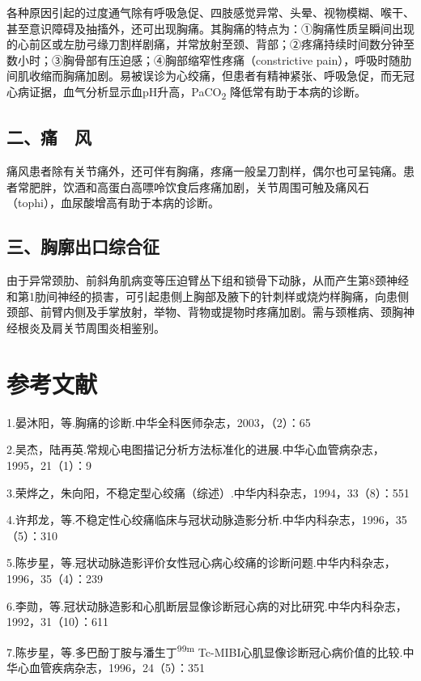 各种原因引起的过度通气除有呼吸急促、四肢感觉异常、头晕、视物模糊、喉干、甚至意识障碍及抽搐外，还可出现胸痛。其胸痛的特点为：①胸痛性质呈瞬间出现的心前区或左肋弓缘刀割样剧痛，并常放射至颈、背部；②疼痛持续时间数分钟至数小时；③胸骨部有压迫感；④胸部缩窄性疼痛（constrictive
pain），呼吸时随肋间肌收缩而胸痛加剧。易被误诊为心绞痛，但患者有精神紧张、呼吸急促，而无冠心病证据，血气分析显示血pH升高，PaCO\textsubscript{2}
降低常有助于本病的诊断。

\subsection{二、痛　风}

痛风患者除有关节痛外，还可伴有胸痛，疼痛一般呈刀割样，偶尔也可呈钝痛。患者常肥胖，饮酒和高蛋白高嘌呤饮食后疼痛加剧，关节周围可触及痛风石（tophi），血尿酸增高有助于本病的诊断。

\subsection{三、胸廓出口综合征}

由于异常颈肋、前斜角肌病变等压迫臂丛下组和锁骨下动脉，从而产生第8颈神经和第1肋间神经的损害，可引起患侧上胸部及腋下的针刺样或烧灼样胸痛，向患侧颈部、前臂内侧及手掌放射，举物、背物或提物时疼痛加剧。需与颈椎病、颈胸神经根炎及肩关节周围炎相鉴别。

\protect\hypertarget{text00102.html}{}{}

\section{参考文献}

1.晏沐阳，等.胸痛的诊断.中华全科医师杂志，2003，（2）：65

2.吴杰，陆再英.常规心电图描记分析方法标准化的进展.中华心血管病杂志，1995，21（1）：9

3.荣烨之，朱向阳，不稳定型心绞痛（综述）.中华内科杂志，1994，33（8）：551

4.许邦龙，等.不稳定性心绞痛临床与冠状动脉造影分析.中华内科杂志，1996，35（5）：310

5.陈步星，等.冠状动脉造影评价女性冠心病心绞痛的诊断问题.中华内科杂志，1996，35（4）：239

6.李勋，等.冠状动脉造影和心肌断层显像诊断冠心病的对比研究.中华内科杂志，1992，31（10）：611

7.陈步星，等.多巴酚丁胺与潘生丁\textsuperscript{99m}
Tc-MIBI心肌显像诊断冠心病价值的比较.中华心血管疾病杂志，1996，24（5）：351

